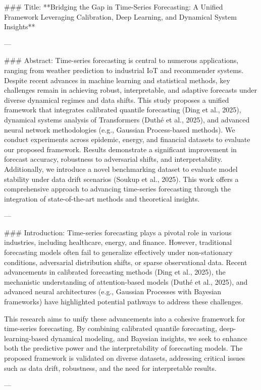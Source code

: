 ### Title:
**Bridging the Gap in Time-Series Forecasting: A Unified Framework Leveraging Calibration, Deep Learning, and Dynamical System Insights**

---

### Abstract:
Time-series forecasting is central to numerous applications, ranging from weather prediction to industrial IoT and recommender systems. Despite recent advances in machine learning and statistical methods, key challenges remain in achieving robust, interpretable, and adaptive forecasts under diverse dynamical regimes and data shifts. This study proposes a unified framework that integrates calibrated quantile forecasting (Ding et al., 2025), dynamical systems analysis of Transformers (Duthé et al., 2025), and advanced neural network methodologies (e.g., Gaussian Process-based methods). We conduct experiments across epidemic, energy, and financial datasets to evaluate our proposed framework. Results demonstrate a significant improvement in forecast accuracy, robustness to adversarial shifts, and interpretability. Additionally, we introduce a novel benchmarking dataset to evaluate model stability under data drift scenarios (Soukup et al., 2025). This work offers a comprehensive approach to advancing time-series forecasting through the integration of state-of-the-art methods and theoretical insights.

---

### Introduction:
Time-series forecasting plays a pivotal role in various industries, including healthcare, energy, and finance. However, traditional forecasting models often fail to generalize effectively under non-stationary conditions, adversarial distribution shifts, or sparse observational data. Recent advancements in calibrated forecasting methods (Ding et al., 2025), the mechanistic understanding of attention-based models (Duthé et al., 2025), and advanced neural architectures (e.g., Gaussian Processes with Bayesian frameworks) have highlighted potential pathways to address these challenges. 

This research aims to unify these advancements into a cohesive framework for time-series forecasting. By combining calibrated quantile forecasting, deep-learning-based dynamical modeling, and Bayesian insights, we seek to enhance both the predictive power and the interpretability of forecasting models. The proposed framework is validated on diverse datasets, addressing critical issues such as data drift, robustness, and the need for interpretable results.

---


